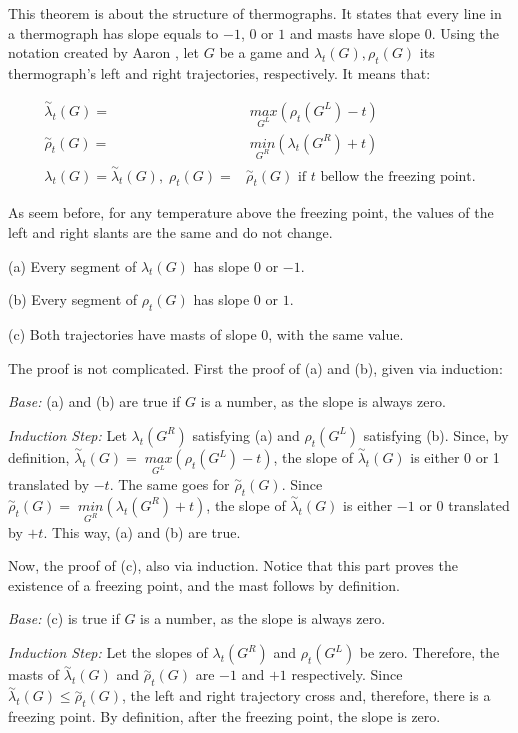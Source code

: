 This theorem is about the structure of thermographs. It states that every line in a thermograph has slope equals to ${-}1$, $0$ or $1$ and masts have slope 0. Using the notation created by Aaron \cite{CGT}, let $G$ be a game and $\lambda_t(G), \rho_t(G)$ its thermograph's left and right trajectories, respectively. It means that:

\begin{align*}
\overset{\sim}{\lambda}_t(G) =&\; \underset{G^L}{max}(\rho_t(G^L)- t)\\
\overset{\sim}{\rho}_t(G) =&\; \underset{G^R}{min}(\lambda_t(G^R) + t)\\
\lambda_t(G) = \overset{\sim}{\lambda}_t(G),\;\rho_t(G) =& \overset{\sim}{\rho}_t(G)\text{ if $t$ bellow the freezing point.}
\end{align*}

As seem before, for any temperature above the freezing point, the values of the left and right slants are the same and do not change. 

(a) Every segment of $\lambda_t(G)$ has slope 0 or ${-}1$.

(b) Every segment of $\rho_t(G)$ has slope 0 or $1$.

(c) Both trajectories have masts of slope 0, with the same value.

The proof is not complicated. First the proof of (a) and (b), given via induction:

\textit{Base:} (a) and (b) are true if $G$ is a number, as the slope is always zero.

\textit{Induction Step:} Let $\lambda_t(G^R)$ satisfying (a) and $\rho_t(G^L)$ satisfying (b). Since, by definition, \mbox{$\overset{\sim}{\lambda}_t(G) =\; \underset{G^L}{max}(\rho_t(G^L)- t)$}, the slope of $\overset{\sim}{\lambda}_t(G)$ is either 0 or 1 translated by ${-}t$. The same goes for $\overset{\sim}{\rho}_t(G)$. Since \mbox{$\overset{\sim}{\rho}_t(G) =\; \underset{G^R}{min}(\lambda_t(G^R) + t)$}, the slope of $\overset{\sim}{\lambda}_t(G)$ is either ${-}1$ or 0 translated by ${+}t$. This way, (a) and (b) are true.

Now, the proof of (c), also via induction. Notice that this part proves the existence of a freezing point, and the mast follows by definition.

\textit{Base:} (c) is true if $G$ is a number, as the slope is always zero.

\textit{Induction Step:} Let the slopes of $\lambda_t(G^R)$ and $\rho_t(G^L)$ be zero. Therefore, the masts of $\overset{\sim}{\lambda}_t(G)$ and $\overset{\sim}{\rho}_t(G)$ are ${-}1$ and ${+}1$ respectively. Since $\overset{\sim}{\lambda}_t(G) \leq \overset{\sim}{\rho}_t(G)$, the left and right trajectory cross and, therefore, there is a freezing point. By definition, after the freezing point, the slope is zero.

